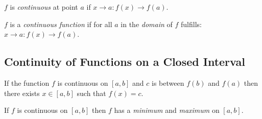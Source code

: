 \documentclass[00_complete]{subfiles}
\begin{document}
$f$ is \emph{continuous} at point $a$ if $x \to a: f(x) \to f(a)$.

$f$ is a \emph{continuous function} if for all $a$ in the \emph{domain} of $f$ fulfills: $x \to a: f(x) \to f(a)$.

\subsection{Continuity of Functions on a Closed Interval}

\begin{theorem}
If the function $f$ is continuous on $[a,b]$ and $c$ is between $f(b)$ and
$f(a)$ then there exists $x \in [a,b]$ such that $f(x) = c$.
\end{theorem}

\begin{theorem}
If $f$ is continuous on $[a,b]$ then $f$ has a \emph{minimum} and
\emph{maximum} on $[a,b]$.
\end{theorem}
\end{document}
